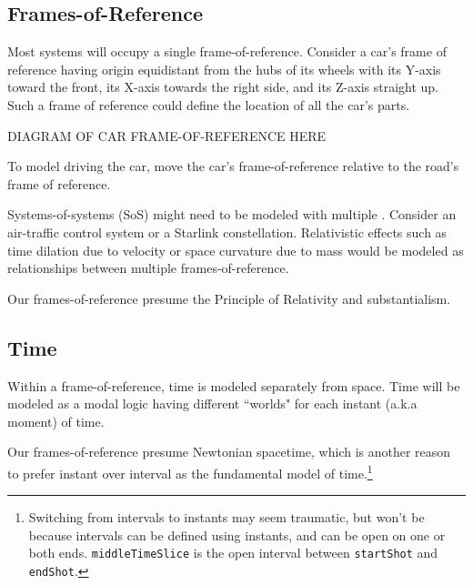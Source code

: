 \subsection{Frames-of-Reference}\label{sec:frames}

\pn Most systems will occupy a single frame-of-reference. 
Consider a car's frame of reference having origin equidistant from the hubs of its wheels with its Y-axis toward the front, its X-axis towards the right side, and its Z-axis straight up.  Such a frame of reference could define the location of all the car's parts.  

DIAGRAM OF CAR FRAME-OF-REFERENCE HERE 

\pn To model driving the car, move the car's frame-of-reference relative to the road's frame of reference.

\pn Systems-of-systems (SoS) might need to be modeled with multiple .  Consider an air-traffic control system or a Starlink constellation.  Relativistic effects such as time dilation due to velocity or space curvature due to mass would be modeled as relationships between multiple frames-of-reference.



\pn Our frames-of-reference presume the Principle of Relativity and substantialism.

\subsection{Time}\label{sec:fortime}

\pn Within a frame-of-reference, time is modeled separately from space.  Time will be modeled as a modal logic having different ``worlds" for each instant (a.k.a moment) of time.  


\pn Our frames-of-reference presume Newtonian spacetime\cite{spacetime-bebecome}, which is another reason to prefer instant over interval as the fundamental model of time.\footnote{Switching from intervals to instants may seem traumatic, but won't be because intervals can be defined using instants, and can be open on one or both ends.  \texttt{middleTimeSlice} is the open interval between \texttt{startShot} and \texttt{endShot}.}

